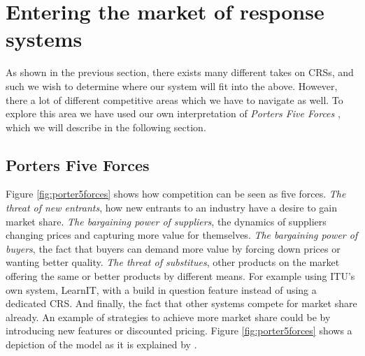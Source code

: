 \section{Entering the market of response systems}


As shown in the previous section, there exists many different takes on CRSs, and such we wish to determine where our system will fit into the above. However, there a lot of different competitive areas which we have to navigate as well. To explore this area we have used our own interpretation of \emph{Porters Five Forces} \cite{porter1979competitive}, which we will describe in the following section. 


\subsection{Porters Five Forces}
Figure \ref{fig:porter5forces} shows how competition can be seen as five forces. 
\emph{The threat of new entrants}, how new entrants to an industry have a desire to gain market share. \emph{The bargaining power of suppliers}, the dynamics of suppliers changing prices and capturing more value for themselves. \emph{The bargaining power of buyers}, the fact that buyers can demand more value by forcing down prices or wanting better quality. \emph{The threat of substitues}, other products on the market offering the same or better products by different means. For example using ITU's own system, LearnIT, with a build in question feature instead of using a dedicated CRS. And finally, the fact that other systems compete for market share already. An example of strategies to achieve more market share could be by introducing new features or discounted pricing. Figure \ref{fig:porter5forces} shows a depiction of the model as it is explained by .


